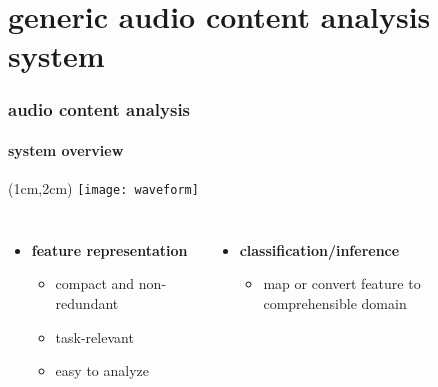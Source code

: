     \section[ACA]{generic audio content analysis system}
        \begin{frame}\frametitle{audio content analysis}\framesubtitle{system overview}
            \begin{textblock*}{100mm}(1cm,2cm)
                \texttt{[image: waveform]}
            \end{textblock*}
            \begin{figure}
                \centering
            \end{figure}
            
            \begin{columns}
                    \begin{itemize}
                        \item<2>[]	\textbf{feature representation}
                                \begin{itemize}
                                    \item 	compact and non-redundant
                                    \item	task-relevant
                                    \item   easy to analyze
                                \end{itemize}
                    \end{itemize}
                    \begin{itemize}
                        \item<3->[]	\textbf{classification/inference}
                                \begin{itemize}
                                    \item	map or convert feature to comprehensible domain
                                \end{itemize}
                    \end{itemize}
            \end{columns}
        \end{frame}

